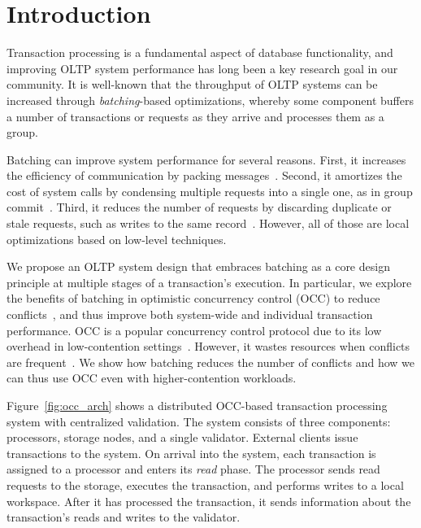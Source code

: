 \section{Introduction}\label{sec:intro}

Transaction processing is a fundamental aspect of database functionality, and improving OLTP system performance has long been a key research goal in our community. It is well-known that the throughput of OLTP systems can be increased through \emph{batching}-based optimizations, whereby some component buffers a number of transactions or requests as they arrive and processes them as a group.

Batching can improve system performance for several reasons. First, it increases the efficiency of communication by packing messages~\cite{ding2015centiman,friedman1997packing}. Second, it amortizes the cost of system calls by condensing multiple requests into a single one, as in group commit~\cite{debrabant2013anti,hagmann1987reimplementing}. Third, it reduces the number of requests by discarding duplicate or stale requests, such as writes to the same record~\cite{faleiro2014lazy}. However, all of those are local optimizations based on low-level techniques.

We propose an OLTP system design that embraces batching as a core design principle at multiple stages of a transaction's execution. In particular, we explore the benefits of batching in optimistic concurrency control (OCC) to reduce conflicts~\cite{kung81tods}, and thus improve both system-wide and individual transaction performance. OCC is a popular concurrency control protocol due to its low overhead in low-contention settings~\cite{adya97podc, baker11cidr, bernstein2015optimizing,bernstein11cidr, bernstein11vldb, corbett12osdi,warp, patterson12vldb,peng10osdi}. However, it wastes resources when conflicts are frequent~\cite{agrawal1987concurrency}. We show how batching reduces the number of conflicts and how we can thus use OCC even with higher-contention workloads.


Figure~\ref{fig:occ_arch} shows a distributed OCC-based transaction processing system with centralized validation. The system consists of three components: processors, storage nodes, and a single validator. External clients issue transactions to the system. On arrival into the system, each transaction is assigned to a processor and enters its \emph{read} phase. The processor sends read requests to the storage, executes the transaction, and performs writes to a local workspace. After it has processed the transaction, it sends information about the transaction's reads and writes to the validator. 

